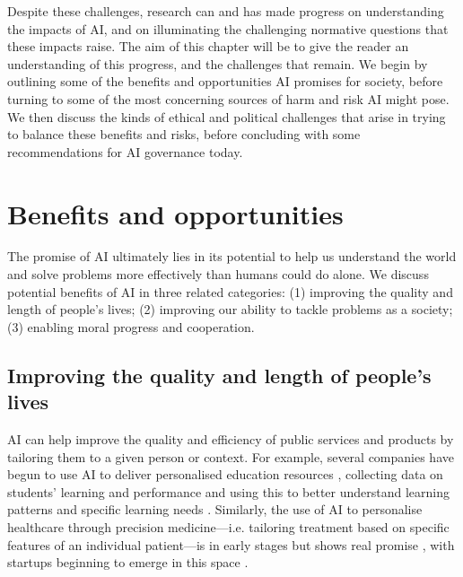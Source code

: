 \documentclass{article}
\begin{document}
Despite these challenges, research can and has made progress on understanding the impacts of AI, and on illuminating the challenging normative questions that these impacts raise. The aim of this chapter will be to give the reader an understanding of this progress, and the challenges that remain. We begin by outlining some of the benefits and opportunities AI promises for society, before turning to some of the most concerning sources of harm and risk AI might pose. We then discuss the kinds of ethical and political challenges that arise in trying to balance these benefits and risks, before concluding with some recommendations for AI governance today.

\section{Benefits and opportunities}

The promise of AI ultimately lies in its potential to help us understand the world and solve problems more effectively than humans could do alone. We discuss potential benefits of AI in three related categories: (1) improving the quality and length of people’s lives; (2) improving our ability to tackle problems as a society; (3) enabling moral progress and cooperation.

\subsection{Improving the quality and length of people’s lives}

AI can help improve the quality and efficiency of public services and products by tailoring them to a given person or context. For example, several companies have begun to use AI to deliver personalised education resources \citep{hao_china_2019}, collecting data on students’ learning and performance and using this to better understand learning patterns and specific learning needs \citep{luan_review_2021}. Similarly, the use of AI to personalise healthcare through precision medicine---i.e. tailoring treatment based on specific features of an individual patient---is in early stages but shows real promise  \citep{xu_translating_2019,johnson_precision_2021}, with startups beginning to emerge in this space \citep{toews_these_2020}.
\end{document}
